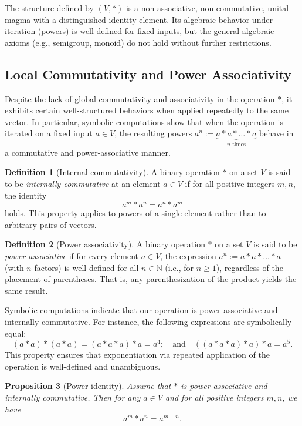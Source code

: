 \documentclass[12pt]{article}
\theoremstyle{definition}
\newtheorem{definition}{Definition}[section]
\theoremstyle{plain}
\newtheorem{proposition}[definition]{Proposition}
\theoremstyle{remark}
\begin{document}
The structure defined by \( (V, *) \) is a non-associative, non-commutative, unital magma with a distinguished identity element. Its algebraic behavior under iteration (powers) is well-defined for fixed inputs, but the general algebraic axioms (e.g., semigroup, monoid) do not hold without further restrictions.

\subsection*{Local Commutativity and Power Associativity}

Despite the lack of global commutativity and associativity in the operation \( * \), it exhibits certain well-structured behaviors when applied repeatedly to the same vector. In particular, symbolic computations show that when the operation is iterated on a fixed input \( a \in V \), the resulting powers \( a^n := \underbrace{a * a * \dots * a}_{n \text{ times}} \) behave in a commutative and power-associative manner.

\begin{definition}[Internal commutativity]
A binary operation \( * \) on a set \( V \) is said to be \emph{internally commutative} at an element \( a \in V \) if for all positive integers \( m, n \), the identity
\[
a^m * a^n = a^n * a^m
\]
holds. This property applies to powers of a single element rather than to arbitrary pairs of vectors.
\end{definition}

\begin{definition}[Power associativity]
A binary operation \( * \) on a set \( V \) is said to be \emph{power associative} if for every element \( a \in V \), the expression \( a^n := a * a * \dots * a \) (with \( n \) factors) is well-defined for all \( n \in \mathbb{N} \) (i.e., for \( n \ge 1 \)), regardless of the placement of parentheses. That is, any parenthesization of the product yields the same result.
\end{definition}

Symbolic computations indicate that our operation is power associative and internally commutative. For instance, the following expressions are symbolically equal:
\[
(a * a) * (a * a) = (a * a * a) * a = a^4; \quad \text{and} \quad ((a * a * a) * a) * a = a^5.
\]
This property ensures that exponentiation via repeated application of the operation is well-defined and unambiguous.

\begin{proposition}[Power identity]
Assume that \( * \) is power associative and internally commutative. Then for any \( a \in V \) and for all positive integers \( m, n \), we have
\[
a^m * a^n = a^{m+n}.
\]
\end{proposition}
\end{document}

